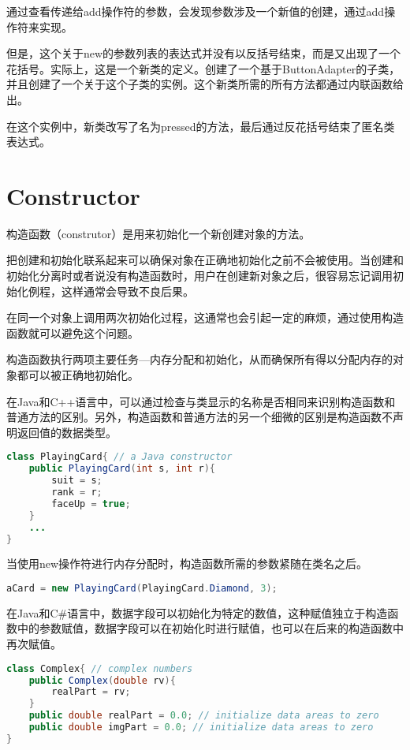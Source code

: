 通过查看传递给add操作符的参数，会发现参数涉及一个新值的创建，通过add操作符来实现。

但是，这个关于new的参数列表的表达式并没有以反括号结束，而是又出现了一个花括号。实际上，这是一个新类的定义。创建了一个基于ButtonAdapter的子类，并且创建了一个关于这个子类的实例。这个新类所需的所有方法都通过内联函数给出。

在这个实例中，新类改写了名为pressed的方法，最后通过反花括号结束了匿名类表达式。


\chapter{Constructor}

构造函数（construtor）是用来初始化一个新创建对象的方法。

把创建和初始化联系起来可以确保对象在正确地初始化之前不会被使用。当创建和初始化分离时或者说没有构造函数时，用户在创建新对象之后，很容易忘记调用初始化例程，这样通常会导致不良后果。

在同一个对象上调用两次初始化过程，这通常也会引起一定的麻烦，通过使用构造函数就可以避免这个问题。

构造函数执行两项主要任务—内存分配和初始化，从而确保所有得以分配内存的对象都可以被正确地初始化。

在Java和C++语言中，可以通过检查与类显示的名称是否相同来识别构造函数和普通方法的区别。另外，构造函数和普通方法的另一个细微的区别是构造函数不声明返回值的数据类型。

\begin{lstlisting}[language=Java]
class PlayingCard{ // a Java constructor
	public PlayingCard(int s, int r){
		suit = s;
		rank = r;
		faceUp = true;
	}
	...
}
\end{lstlisting}


当使用new操作符进行内存分配时，构造函数所需的参数紧随在类名之后。


\begin{lstlisting}[language=Java]
aCard = new PlayingCard(PlayingCard.Diamond, 3);
\end{lstlisting}

在Java和C\#语言中，数据字段可以初始化为特定的数值，这种赋值独立于构造函数中的参数赋值，数据字段可以在初始化时进行赋值，也可以在后来的构造函数中再次赋值。



\begin{lstlisting}[language=Java]
class Complex{ // complex numbers
	public Complex(double rv){
		realPart = rv;
	}
	public double realPart = 0.0; // initialize data areas to zero
	public double imgPart = 0.0; // initialize data areas to zero
}
\end{lstlisting}

